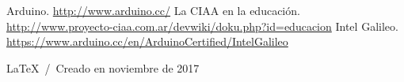 \documentclass[a4paper]{article}
\begin{document}
\begin{thebibliography}{9}
   Arduino. \href{http://www.arduino.cc/}{http://www.arduino.cc/}
   La CIAA en la educación. \href{http://www.proyecto-ciaa.com.ar/devwiki/doku.php?id=educacion}{http://www.proyecto-ciaa.com.ar/devwiki/doku.php?id=educacion}
   Intel Galileo. \href{https://www.arduino.cc/en/ArduinoCertified/IntelGalileo}{https://www.arduino.cc/en/ArduinoCertified/IntelGalileo}
\end{thebibliography}

\vfill
\begin{flushright}
  \LaTeX~/~Creado en noviembre de 2017
\end{flushright}
\end{document}
